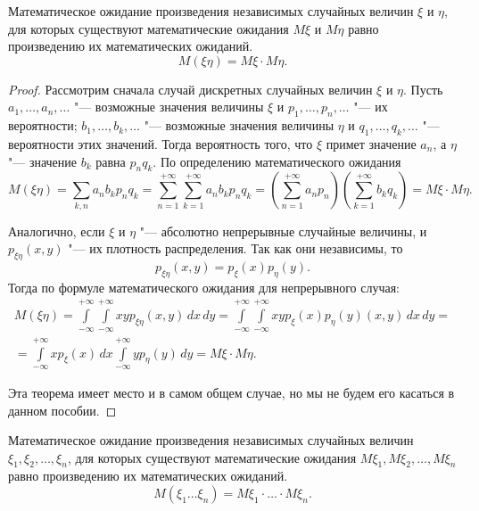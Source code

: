 \begin{thm}[мультипликативность]
Математическое ожидание произведения независимых случайных величин $\xi$ и $\eta$, для которых существуют математические ожидания $M\xi$ и $M\eta$ равно произведению их математических ожиданий.
$$
M (\xi\eta)=M\xi\cdot M\eta.
$$
\end{thm}
\begin{proof}
Рассмотрим сначала случай дискретных случайных величин $\xi$ и $\eta$. Пусть $a_1,\dots,a_n,\dots$ "--- возможные значения величины $\xi$ и $p_1,\dots,p_n,\dots$ "--- их вероятности; $b_1,\dots,b_k,\dots$ "--- возможные значения величины $\eta$ и $q_1,\dots,q_k,\dots$ "--- вероятности этих значений. Тогда вероятность того, что $\xi$ примет значение $a_n$, а $\eta$ "--- значение $b_k$ равна $p_n q_k$. По определению математического ожидания 
$$
M(\xi\eta)=\sum\limits_{k,n}a_n b_k p_n q_k = \sum\limits_{n=1}^{+\infty}\sum\limits_{k=1}^{+\infty} a_n b_k p_n q_k =\left(\sum\limits_{n=1}^{+\infty}a_n p_n\right)\left(\sum\limits_{k=1}^{+\infty}b_k q_k\right)=M\xi\cdot M\eta.
$$

Аналогично, если $\xi$ и $\eta$ "--- абсолютно непрерывные случайные величины, и $p_{\xi\eta}(x,y)$ "--- их плотность распределения. Так как они независимы, то
$$
p_{\xi\eta}(x,y)=p_\xi(x)p_\eta(y).
$$
Тогда по формуле математического ожидания для непрерывного случая:
\begin{multline*}
M(\xi\eta)=\int\limits_{-\infty}^{+\infty}\int\limits_{-\infty}^{+\infty}xyp_{\xi\eta}(x,y)\,dx\,dy=\int\limits_{-\infty}^{+\infty}\int\limits_{-\infty}^{+\infty}xyp_\xi(x)p_\eta(y)(x,y)\,dx\,dy=\\=\int\limits_{-\infty}^{+\infty}xp_\xi(x)\,dx\int\limits_{-\infty}^{+\infty}yp_\eta(y)\,dy=M\xi\cdot M\eta.
\end{multline*}

Эта теорема имеет место и в самом общем случае, но мы не будем его касаться в данном пособии.
\end{proof}
\begin{cons}
Математическое ожидание произведения независимых случайных величин $\xi_1,\xi_2,\dots, \xi_n$, для которых существуют математические ожидания $M\xi_1,M\xi_2,\dots, M\xi_n$ равно произведению их математических ожиданий.
$$
M (\xi_1\dots\xi_n)=M\xi_1\cdot\dots\cdot M\xi_n.
$$
\end{cons}

